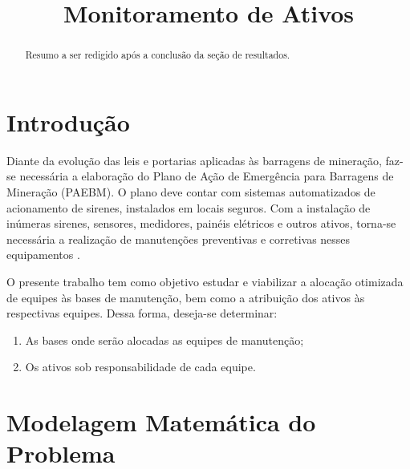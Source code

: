 \documentclass[conference]{IEEEtran}
\begin{document}
\title{Monitoramento de Ativos}

\author{
}

\maketitle

\begin{abstract}
Resumo a ser redigido após a conclusão da seção de resultados.
\end{abstract}

\IEEEpeerreviewmaketitle

\section{Introdução}

Diante da evolução das leis e portarias aplicadas às barragens de mineração, faz-se necessária a elaboração do Plano de Ação de Emergência para Barragens de Mineração (PAEBM). O plano deve contar com sistemas automatizados de acionamento de sirenes, instalados em locais seguros. Com a instalação de inúmeras sirenes, sensores, medidores, painéis elétricos e outros ativos, torna-se necessária a realização de manutenções preventivas e corretivas nesses equipamentos \cite{batista_tc}.

O presente trabalho tem como objetivo estudar e viabilizar a alocação otimizada de equipes às bases de manutenção, bem como a atribuição dos ativos às respectivas equipes. Dessa forma, deseja-se determinar:
\begin{enumerate}
  \item As bases onde serão alocadas as equipes de manutenção;
  \item Os ativos sob responsabilidade de cada equipe.
\end{enumerate}

\section{Modelagem Matemática do Problema}
\end{document}
